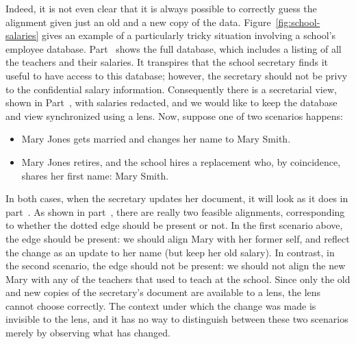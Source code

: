 Indeed, it is not even clear that it is always possible to correctly guess
the alignment given just an old and a new copy of the data.
Figure~\ref{fig:school-salaries} gives an example of a particularly tricky
situation involving a school's employee database.
Part~ shows the full database, which includes
a listing of all the teachers and their salaries. It transpires that the
school secretary finds it useful to have access to this database; however,
the secretary should not be privy to the confidential salary information.
Consequently there is a secretarial view, shown in
Part~, with salaries redacted, and we
would like to keep the database and view synchronized using a \map lens.
Now, suppose one of two scenarios happens:
\begin{itemize}
    \item Mary Jones gets married and changes her name to Mary Smith.
    \item Mary Jones retires, and the school hires a replacement who, by
        coincidence, shares her first name: Mary Smith.
\end{itemize}
In both cases, when the secretary updates her document, it will look as it
does in part~. As shown in
part~, there are really two feasible
alignments, corresponding to whether the dotted edge should be present or
not. In the first scenario above, the edge should be present: we should
align Mary with her former self, and reflect the change as an update to her
name (but keep her old salary). In contrast, in the second scenario, the
edge should not be present: we should not align the new Mary with any of the
teachers that used to teach at the school. Since only the old and new copies
of the secretary's document are available to a lens, the lens cannot choose
correctly. The context under which the change was made is invisible to the
lens, and it has no way to distinguish between these two scenarios merely by
observing what has changed.

